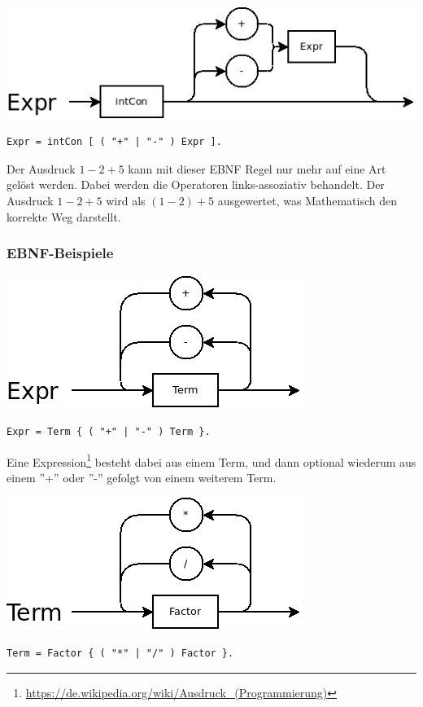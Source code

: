 \includegraphics[scale=0.5]{./media/images/compiler/ambiguity_correct.png}

\begin{lstlisting}[language=EBNF]
Expr = intCon [ ( "+" | "-" ) Expr ].
\end{lstlisting}

Der Ausdruck $1-2+5$ kann mit dieser EBNF Regel nur mehr auf eine Art gelöst werden. Dabei werden die Operatoren links-assoziativ behandelt. Der Ausdruck $1-2+5$ wird als $(1-2)+5$ ausgewertet, was Mathematisch den korrekte Weg darstellt.

\subsubsection{EBNF-Beispiele}

\includegraphics[scale=0.5]{./media/images/compiler/ebnf_expr.png}

\begin{lstlisting}[language=EBNF]
Expr = Term { ( "+" | "-" ) Term }.
\end{lstlisting}

Eine Expression\footnote{\url{https://de.wikipedia.org/wiki/Ausdruck_(Programmierung)}} besteht dabei aus einem Term, und dann optional wiederum aus einem ''+'' oder ''-'' gefolgt von einem weiterem Term.

\includegraphics[scale=0.5]{./media/images/compiler/ebnf_term.png}
\begin{lstlisting}[language=EBNF]
Term = Factor { ( "*" | "/" ) Factor }.
\end{lstlisting}

